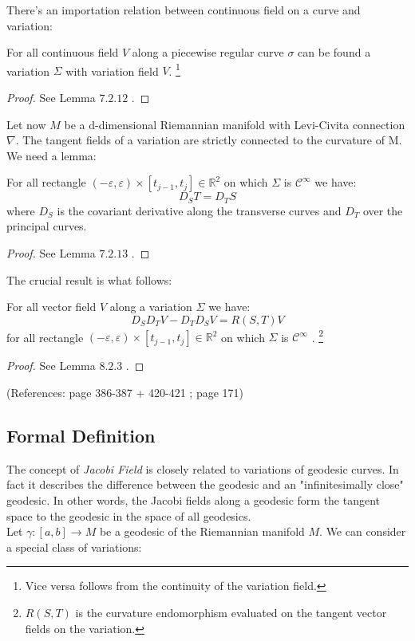 \documentclass[a4paper,12pt]{scrartcl}    %
\begin{document}
There's an importation relation between continuous field on a curve and variation:
\begin{proposition}
 For all continuous field $V$ along a piecewise regular curve $\sigma$ can be found a variation 
 $\Sigma$ with variation field $V$.
 \footnote{Vice versa follows from the continuity of the variation field.}
\end{proposition}
\begin{proof}
 See \cite{Abate2011} Lemma $7.2.12$ .
\end{proof}

\vspace{8mm}
Let now $M$ be a d-dimensional Riemannian manifold with Levi-Civita connection $\nabla$.
The tangent fields of a variation are strictly connected to the curvature of M.
We need a lemma:

\begin{lemma}
 For all rectangle $(-\varepsilon,\varepsilon) \times [t_{j-1}, t_j] \in \mathbb{R}^2$ 
 on which $\Sigma$ is $\mathcal{C}^{\infty}$ we have:
 \begin{displaymath}
   D_S T = D_T S
 \end{displaymath}
 where $D_S$ is the covariant derivative along the transverse curves and $D_T$ over the principal curves.
\end{lemma}
\begin{proof}
 See \cite{Abate2011} Lemma $7.2.13$ .
\end{proof}
The crucial result is what follows:
\begin{proposition}
 For all vector field $V$ along a variation $\Sigma$ we have:
 \begin{displaymath}
   D_S D_T V - D_T D_S V = R( S, T) V
 \end{displaymath}
 for all rectangle $(-\varepsilon,\varepsilon) \times [t_{j-1}, t_j] \in \mathbb{R}^2$ on which $\Sigma$ is $\mathcal{C}^{\infty}$ .
 \footnote{$ R(S, T)$ is the curvature endomorphism evaluated on the tangent vector fields on the variation.}
\end{proposition}
\begin{proof}
 See \cite{Abate2011} Lemma $8.2.3$ .
\end{proof}

 (References: \cite{Abate2011} page 386-387 + 420-421 ; \cite{Jost2005} page 171)


\subsection{Formal Definition}
The concept of \emph{Jacobi Field} is closely related to variations of geodesic curves.
In fact it describes the difference between the geodesic and an "infinitesimally close" geodesic. In other words, the Jacobi fields along a geodesic form the tangent space to the geodesic in the space of all geodesics. 
\\
Let $\gamma:[a,b]\rightarrow M$ be a geodesic of the Riemannian manifold $M$. We can consider a special class of variations:
\end{document}
